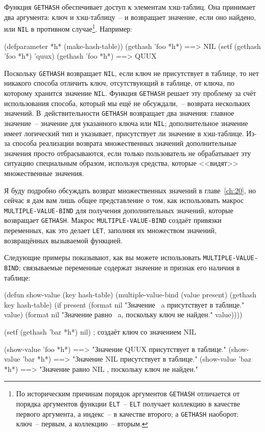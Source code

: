 Функция \lstinline{GETHASH} обеспечивает доступ к элементам хэш-таблиц.  Она принимает два
аргумента: ключ и хэш-таблицу~-- и возвращает значение, если оно найдено, или \lstinline{NIL} в
противном случае\footnote{По историческим причинам порядок аргументов \lstinline{GETHASH}
  отличается от порядка аргументов функции \lstinline{ELT}~-- \lstinline{ELT} получает коллекцию в
  качестве первого аргумента, а индекс~-- в качестве второго; а \lstinline{GETHASH} наоборот:
  ключ~-- первым, а коллекцию~-- вторым.}.  Например:

\begin{myverb}
(defparameter *h* (make-hash-table))
(gethash 'foo *h*) ==> NIL
(setf (gethash 'foo *h*) 'quux)
(gethash 'foo *h*) ==> QUUX
\end{myverb}

Поскольку \lstinline{GETHASH} возвращает \lstinline{NIL}, если ключ не присутствует в таблице, то нет
никакого способа отличить ключ, отсутствующий в таблице, от ключа, по которому хранится
значение \lstinline{NIL}.  Функция \lstinline{GETHASH} решает эту проблему за счёт использования
способа, который мы ещё не обсуждали,~-- возврата нескольких значений.  В~действительности
\lstinline{GETHASH} возвращает два значения: главное значение~-- значение для указанного ключа
или \lstinline{NIL};  дополнительное значение имеет логический тип и указывает, присутствует ли
значение в хэш-таблице.  Из-за способа реализации возврата множественных значений
дополнительные значения просто отбрасываются, если только пользователь не обрабатывает эту
ситуацию специальным образом, используя средства, которые <<видят>> множественные значения.

Я буду подробно обсуждать возврат множественных значений в главе~\ref{ch:20}, но сейчас я
дам вам лишь общее представление о том, как использовать макрос \lstinline{MULTIPLE-VALUE-BIND}
для получения дополнительных значений, которые возвращает \lstinline{GETHASH}.  Макрос
\lstinline{MULTIPLE-VALUE-BIND} создаёт привязки переменных, как это делает \lstinline{LET},
заполняя их множеством значений, возвращённых вызываемой функцией.

Следующие примеры показывают, как вы можете использовать \lstinline{MULTIPLE-VALUE-BIND};
связываемые переменные содержат значение и признак его наличия в таблице:

\begin{myverb}  
(defun show-value (key hash-table)
  (multiple-value-bind (value present) (gethash key hash-table)
    (if present
      (format nil "Значение ~a присутствует в таблице." value)
      (format nil "Значение равно ~a, поскольку ключ не найден." value))))

(setf (gethash 'bar *h*) nil) ; создаёт ключ со значением NIL

(show-value 'foo *h*) ==> "Значение QUUX присутствует в таблице."
(show-value 'bar *h*) ==> "Значение NIL присутствует в таблице."
(show-value 'baz *h*) ==> "Значение равно NIL , поскольку ключ не найден."
\end{myverb}

